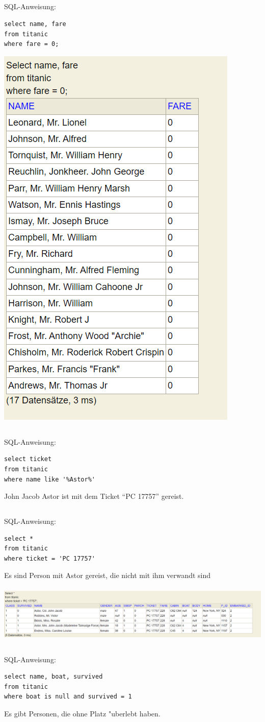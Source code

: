 \documentclass[a4paper, 11pt, titlepage]{article}
\begin{document}
\subsection{}
SQL-Anweisung:
\begin{lstlisting}[style = sql]
select name, fare
from titanic
where fare = 0;
\end{lstlisting}
\includegraphics [width = 4 cm] {e}
\subsection{}
SQL-Anweisung:
\begin{lstlisting}[style = sql]
select ticket
from titanic
where name like '%Astor%'
\end{lstlisting}
John Jacob Astor ist mit dem Ticket "`PC 17757"' gereist.
\subsection{}
SQL-Anweisung:
\begin{lstlisting}[style = sql]
select *
from titanic
where ticket = 'PC 17757'
\end{lstlisting}
Es sind Person mit Astor gereist, die nicht mit ihm verwandt sind\\
\\
\includegraphics [width = 15 cm] {g}
\subsection{}
SQL-Anweisung:
\begin{lstlisting}[style = sql]
select name, boat, survived
from titanic
where boat is null and survived = 1
\end{lstlisting}
Es gibt Personen, die ohne Platz "uberlebt haben.
\end{document}
